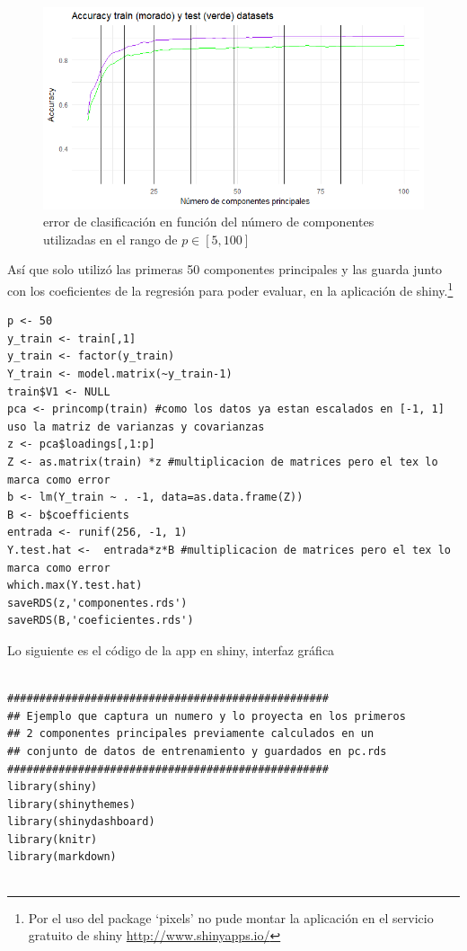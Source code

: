 \documentclass[paper=letter, fontsize=11pt]{scrartcl}
\numberwithin{equation}{section} %
\numberwithin{figure}{section} %
\numberwithin{table}{section} %
\begin{document}
\begin{enumerate}
\FloatBarrier
\begin{figure}[H]
  \begin{center}
    \includegraphics[scale=.7]{errores_zoom.png}
    \caption{error de clasificación en función del número de componentes utilizadas en el rango de $p\in [5,100]$ }
    \label{fig:errroes_PCR_zoom}
  \end{center}
\end{figure}

Así que solo utilizó las primeras 50 componentes principales y las guarda junto con los coeficientes de la regresión para poder evaluar, en la aplicación de shiny.\footnote{Por el uso del package ‘pixels’ no pude montar la aplicación en el servicio gratuito de shiny \url{http://www.shinyapps.io/} }

\begin{lstlisting}[style=customc,basicstyle=\scriptsize]
p <- 50
y_train <- train[,1]
y_train <- factor(y_train)
Y_train <- model.matrix(~y_train-1)
train$V1 <- NULL
pca <- princomp(train) #como los datos ya estan escalados en [-1, 1] uso la matriz de varianzas y covarianzas
z <- pca$loadings[,1:p]
Z <- as.matrix(train) *z #multiplicacion de matrices pero el tex lo marca como error
b <- lm(Y_train ~ . -1, data=as.data.frame(Z))
B <- b$coefficients
entrada <- runif(256, -1, 1)
Y.test.hat <-  entrada*z*B #multiplicacion de matrices pero el tex lo marca como error
which.max(Y.test.hat)
saveRDS(z,'componentes.rds')
saveRDS(B,'coeficientes.rds')
\end{lstlisting} 

Lo siguiente es el código de la app en shiny, interfaz gráfica 

\begin{lstlisting}[style=customc,basicstyle=\scriptsize]

##################################################
## Ejemplo que captura un numero y lo proyecta en los primeros
## 2 componentes principales previamente calculados en un
## conjunto de datos de entrenamiento y guardados en pc.rds
##################################################
library(shiny) 
library(shinythemes)
library(shinydashboard)
library(knitr)
library(markdown)


\end{lstlisting}
\end{enumerate}
\end{document}
